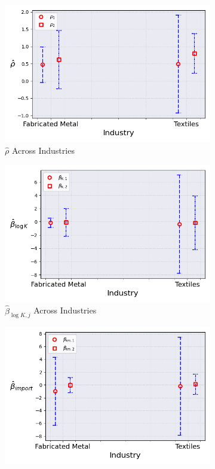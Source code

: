 \documentclass{article}
\begin{document}
\begin{figure}[ht!]
\begin{subfigure}[t]{0.32\textwidth}
        \includegraphics[width=\textwidth]{figure/ar1_mixture_kmshare_ciiu_rho_across_industries_m2.png}
        \caption{$\hat\rho$ Across Industries}
    \end{subfigure}
    \begin{subfigure}[t]{0.32\textwidth}
        \centering
        \includegraphics[width=\textwidth]{figure/ar1_mixture_kmshare_ciiu_beta_k_across_industries_m2.png}
        \caption{$\hat{\beta}_{\log K, j}$ Across Industries}
    \end{subfigure}
    \begin{subfigure}[t]{0.32\textwidth}
        \centering
        \includegraphics[width=\textwidth]{figure/ar1_mixture_kmshare_ciiu_beta_im_across_industries_m2.png}

\end{subfigure}
\end{figure}
\end{document}
